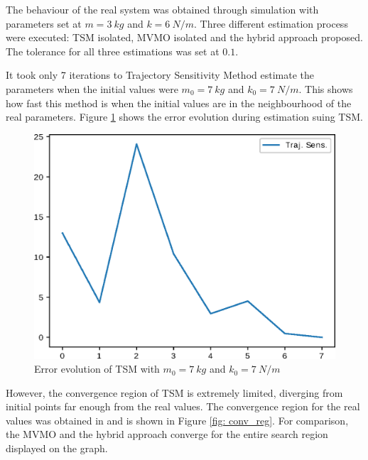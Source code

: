 The behaviour of the real system was obtained through simulation with parameters set at $m = 3\ kg$ and $k = 6\ N/m$. Three different estimation process were executed: TSM isolated, MVMO isolated and the hybrid approach proposed. The tolerance for all three estimations was set at $0.1$.

It took only 7 iterations to Trajectory Sensitivity Method estimate the parameters when the initial values were $m_{0} = 7\ kg$ and $k_{0} = 7\ N/m$. This shows how fast this method is when the initial values are in the neighbourhood of the real parameters. Figure \ref{fig: TS_conv} shows the error evolution during estimation suing TSM.

\begin{figure}[h]
	\caption{Error evolution of TSM with $m_{0} = 7\ kg$ and $k_{0} = 7\ N/m$}
	\begin{center}
		\includegraphics[scale=0.75]{Images/TS_conv.eps}
	\end{center}
	\label{fig: TS_conv}
\end{figure}

However, the convergence region of TSM is extremely limited, diverging from initial points far enough from the real values. The convergence region for the real values was obtained in \cite{Ecyo} and is shown in Figure \ref{fig: conv_reg}. For comparison, the MVMO and the hybrid approach converge for the entire search region displayed on the graph.

